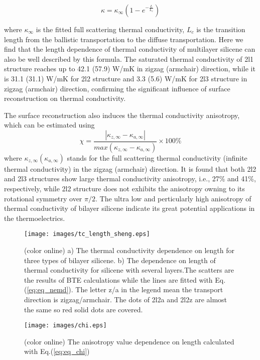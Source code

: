 \documentclass[aps,prb,twocolumn,showpacs,amsmath,amssymb]{revtex4-1}
\begin{document}
\begin{equation}
  \kappa = \kappa_\infty (1-e^{-\frac{L}{L_c}}) \label{eq:eq_nemd}
\end{equation}

where $\kappa_\infty$ is the fitted full scattering thermal conductivity, $L_c$ is the transition length from the ballistic transportation to the diffuse transportation. Here we find that the length dependence of thermal conductivity of multilayer silicene can also be well described by this  formula.
The saturated thermal conductivity of 2l1 structure reaches up to 42.1 (57.9) W/mK in zigzag (armchair) direction, while it is  31.1 (31.1) W/mK  for 2l2 structure and  3.3 (5.6)  W/mK for 2l3 structure in zigzag (armchair) direction, confirming the significant influence of surface reconstruction on thermal conductivity.

The surface reconstruction also induces the thermal conductivity anisotropy, which can be estimated using
\begin{equation}
  \chi=\frac{|\kappa_{z,\infty}-\kappa_{a,\infty} |}{ max⁡(\kappa_{z,\infty}-\kappa_{a,\infty} ) } \times 100 \%  \label{eq:eq_chi}
\end{equation}
where $ \kappa_{z,\infty} (\kappa_{a,\infty})$ stands for the full scattering thermal conductivity (infinite thermal conductivity) in the zigzag (armchair) direction.
It is found that both 2l2 and 2l3 structures show large thermal conductivity anisotropy, i.e., 27\% and 41\%, respectively, while 2l2 structure does not exhibits the anisotropy owning to its rotational symmetry over $\pi/2$.  The ultra low and perticularly high anisotropy of thermal conductivity of bilayer silicene indicate its great potential applications in the thermoelectrics.


\begin{figure}[b]
  \texttt{[image: images/tc\_length\_sheng.eps]}
  \caption{\label{fig:tc_length_sheng} (color online) a) The thermal conductivity dependence on length for three types of bilayer silicene. b) The dependence on length of thermal conductivity for silicene with several layers.The scatters are the results of BTE calculations while the lines are fitted with Eq.(\ref{eq:eq_nemd}). The letter z/a in the legend mean the transport direction is zigzag/armchair. The dots of 2l2a and 2l2z are almost the same so red solid dots are covered. }
\end{figure}

\begin{figure}[b]
  \texttt{[image: images/chi.eps]}{}
  \caption{\label{fig:chi} (color online) The anisotropy value dependence on length calculated with Eq.(\ref{eq:eq_chi})}
\end{figure}
\end{document}
